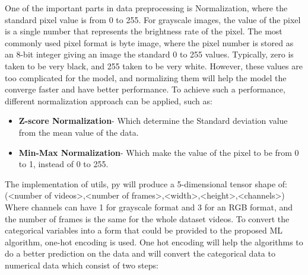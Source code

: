 One of the important parts in data preprocessing is Normalization, where the standard pixel value is from 0 to 255. For grayscale images, the value of the pixel is a single number that represents the brightness rate of the pixel. The most commonly used pixel format is byte image, where the pixel number is stored as an 8-bit integer giving an image the standard 0 to 255 values. Typically, zero is taken to be very black, and 255 taken to be very white. However, these values are too complicated for the model, and normalizing them will help the model the converge faster and have better performance. To achieve such a performance, different normalization approach can be applied, such as:
\begin{itemize}
\item \textbf{Z-score Normalization}- Which determine the Standard deviation value from the mean value of the data.
\item \textbf{Min-Max Normalization}- Which make the value of the pixel to be from 0 to 1, instead of 0 to 255.
\end{itemize}
\hspace{5mm} The implementation of utils, py will produce a 5-dimensional tensor shape of:
(<number  of videos>,<number of frames>,<width>,<height>,<channels>)
Where channels can have 1 for grayscale format and 3 for an RGB format, and the number of frames is the same for the whole dataset videos.
To convert the categorical variables into a form that could be provided to the proposed ML algorithm, one-hot encoding is used. One hot encoding will help the algorithms to do a better prediction on the data and will convert the categorical data to numerical data which consist of two steps:

